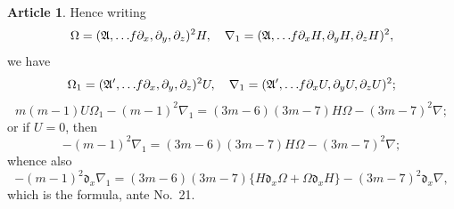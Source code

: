 \documentclass[12pt,a4paper]{article}
\theoremstyle{definition}
\newtheorem{art}{Article}[section]
\begin{document}
\begin{art}
Hence writing
\[
\Omega = (\mathfrak{A}, \ldots \hspace{-2pt} f\partial_x, \partial_y, \partial_z)^2 H, \quad \nabla_1 = (\mathfrak{A}, \ldots \hspace{-2pt} f\partial_x H, \partial_y H, \partial_z H)^2,
\]
we have
\[
\Omega_1 = (\mathfrak{A}', \ldots \hspace{-2pt} f\partial_x, \partial_y, \partial_z)^2 U, \quad \nabla_1 = (\mathfrak{A}', \ldots \hspace{-2pt} f\partial_x U, \partial_y U, \partial_z U)^2;
\]
\[
m(m - 1)U\Omega_1 - (m - 1)^2\nabla_1 = (3m - 6)(3m - 7)H\Omega - (3m - 7)^2\nabla;
\]
or if $U = 0$, then
\[
-(m - 1)^2\nabla_1 = (3m - 6)(3m - 7)H\Omega - (3m - 7)^2\nabla;
\]
whence also
\[
-(m - 1)^2\mathfrak{d}_x\nabla_1 = (3m - 6)(3m - 7)\{H\mathfrak{d}_x\Omega + \Omega\mathfrak{d}_x H\} - (3m - 7)^2\mathfrak{d}_x\nabla,
\]
which is the formula, ante No.~21.
\end{art}
\end{document}
